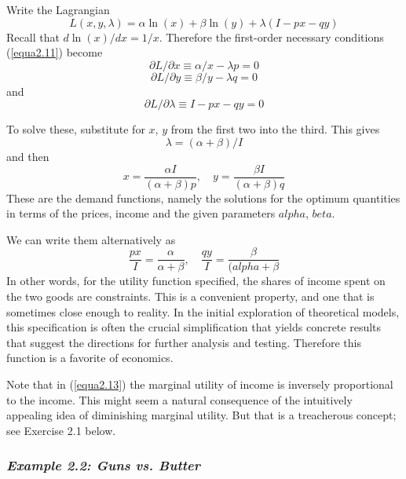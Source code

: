 Write the Lagrangian
\begin{equation*}
L(x,y,\lambda) = \alpha \ln(x) + \beta \ln(y) + \lambda( I-px-qy )
\end{equation*}
Recall that $d\ln(x)/dx=1/x$. Therefore the first-order necessary conditions (\ref{equa2.11}) become
\begin{equation*}
\partial L / \partial x \equiv \alpha / x - \lambda p = 0 
\end{equation*}
\begin{equation*}
\partial L / \partial y \equiv \beta / y - \lambda q = 0
\end{equation*}
and
\begin{equation*}
\partial L / \partial \lambda \equiv I - px - qy = 0
\end{equation*}

To solve these, substitute for $x$, $y$ from the first two into the third. This gives
\begin{equation} \label{equa2.13}
\lambda = ( \alpha + \beta ) /I 
\end{equation}
and then 
\begin{equation} \label{equa2.14}
x =  \dfrac{\alpha I}{(\alpha + \beta)p}, \quad y= \dfrac{\beta I}{(\alpha + \beta)q} 
\end{equation}
These are the demand functions, namely the solutions for the optimum quantities in terms of the prices, income and the given parameters $alpha$, $beta$.

We can write them alternatively as 
\begin{equation} \label{equa2.15}
\dfrac{px}{I} =  \dfrac{\alpha }{\alpha + \beta}, \quad \dfrac{qy}{I}= \dfrac{\beta }{(alpha + \beta} 
\end{equation}
In other words, for the utility function specified, the shares of income spent on the two goods are constraints. This is a convenient property, and one that is sometimes close enough to reality. In the initial exploration of theoretical models, this specification is often the crucial simplification that yields concrete results that suggest the directions for further analysis and testing. Therefore this function is a favorite of economics.

Note that in (\ref{equa2.13}) the marginal utility of income is inversely proportional to the income. This might seem a natural consequence of the intuitively appealing idea of diminishing marginal utility. But that is a treacherous concept; see Exercise 2.1 below.

\subsubsection*{\textit{Example 2.2: Guns vs. Butter} }

